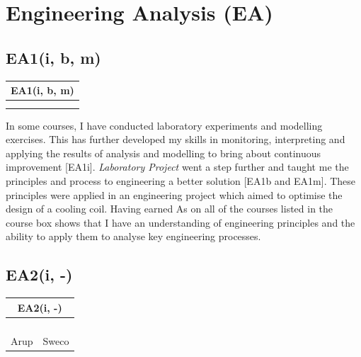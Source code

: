
\section{Engineering Analysis (EA)} \label{EA}

\subsection*{EA1(i, b, m)} 

\begin{table}
	\begin{tabular}{|ll|}
		\hline
		\multicolumn{2}{|c|}{\cellcolor[HTML]{F8A102}\textbf{EA1(i, b, m) \nomaster}} \\ \hline
		\EPA & \DSA \\
		\TPS & \LAB \\ \hline
	\end{tabular}
\end{table}

In some courses, I have conducted laboratory experiments and modelling exercises.
This has further developed my skills in monitoring, interpreting and applying the results of analysis and modelling to bring about continuous improvement [EA1i].
\textit{Laboratory Project} went a step further and taught me the principles and process to engineering a better solution [EA1b and EA1m].
These principles were applied in an engineering project which aimed to optimise the design of a cooling coil.
Having earned As on all of the courses listed in the course box shows that I have an understanding of engineering principles and the ability to apply them to analyse key engineering processes.







\newpage
\subsection*{EA2(i, -)}

\begin{table}
	\begin{tabular}{|ll|}
		\hline
		\multicolumn{2}{|c|}{\cellcolor[HTML]{F8A102}\textbf{EA2(i, -) \nomaster}} \\ \hline
		\ConTechOne & \Acoustics \\
		\HYD & \EPA \\
		\TPS & \PRJ \\
		\LAB &  \\
		Arup & Sweco \\ \hline
	\end{tabular}
\end{table}

